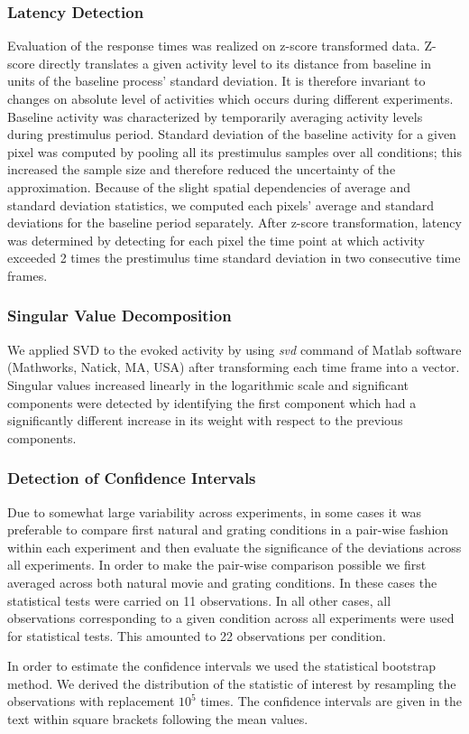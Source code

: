 \subsubsection{Latency Detection}

Evaluation of the response times was realized on z-score transformed data.
Z-score directly translates a given activity level to its distance from
baseline in units of the baseline process' standard deviation. It is
therefore invariant to changes on absolute level of activities which occurs
during different experiments. Baseline activity was characterized by
temporarily averaging activity levels during prestimulus period. Standard
deviation of the baseline activity for a given pixel was computed by
pooling all its prestimulus samples over all conditions; this increased the
sample size and therefore reduced the uncertainty of the approximation.
Because of the slight spatial dependencies of average and standard
deviation statistics, we computed each pixels' average and standard
deviations for the baseline period separately. After z-score
transformation, latency was determined by detecting for each pixel the time
point at which activity exceeded 2 times the prestimulus time standard
deviation in two consecutive time frames. 


\subsubsection{Singular Value Decomposition} 

We applied SVD  to the
evoked activity by using \textit{svd} command of Matlab software
(Mathworks, Natick, MA, USA) after transforming each time frame into a
vector. Singular values increased linearly in the logarithmic scale and
significant components were detected by identifying the first component
which had a significantly different increase in its weight with respect to
the previous components.


\subsubsection{Detection of Confidence Intervals}

Due to somewhat large variability across experiments, in some cases it was
preferable to compare first natural and grating conditions in a pair-wise
fashion within each experiment and then evaluate the significance of the
deviations across all experiments. In order to make the pair-wise
comparison possible we first averaged across both natural movie and grating
conditions. In these cases the statistical tests were carried on 11
observations. In all other cases, all observations corresponding to a given
condition across all experiments were used for statistical tests. This
amounted to 22 observations per condition.

In order to estimate the confidence intervals we used the statistical
bootstrap method. We derived the distribution of the statistic of interest
by resampling the observations with replacement $10^5$ times. The
confidence intervals are given in the text within square brackets following
the mean values.
